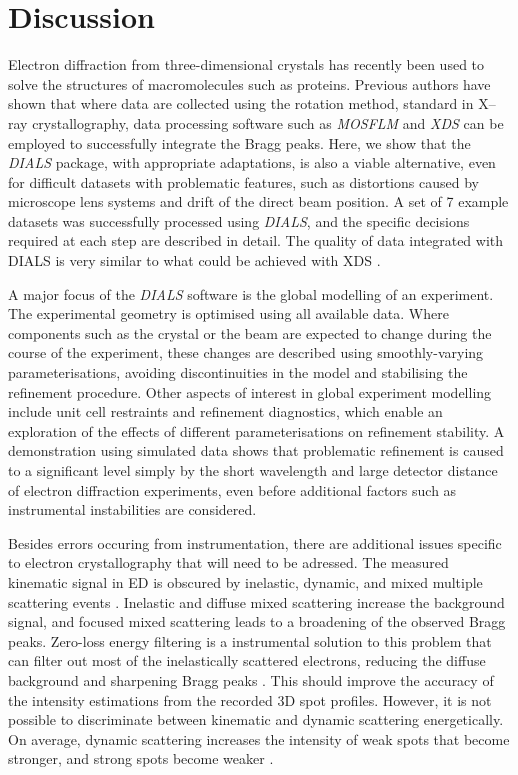 \documentclass[preprint]{iucr}
\newcommand{\dials}{\emph{DIALS}\xspace}
\newcommand{\xds}{\emph{XDS}\xspace}
\newcommand{\mosflm}{\emph{MOSFLM}\xspace}
\newcounter{MCCounter}
\newcommand{\MC}[1]{%
   \stepcounter{MCCounter}%
   {\color{blue}{\textbf{MC \#\arabic{MCCounter}: }#1}}%
  }
\begin{document}
\section{Discussion}

\MC{read again and revise some parts}

Electron diffraction from three-dimensional crystals has recently been used to
solve the structures of macromolecules such as proteins. Previous authors have
shown that where data are collected using the rotation method, standard in
X--ray crystallography, data processing software such as \mosflm and
\xds can be employed to successfully integrate the Bragg peaks. Here, we show
that the \dials package, with appropriate adaptations, is also a viable
alternative, even for difficult datasets with problematic features, such as
distortions caused by microscope lens systems and drift of the direct beam
position. A set of 7 example datasets was successfully processed using \dials,
and the specific decisions required at each step are described in detail. The
quality of data integrated with DIALS is very similar to what could be achieved 
with XDS \cite{Clabbers2017}.

A major focus of the \dials software is the global modelling of an experiment.
The experimental geometry is optimised using all available data. Where
components such as the crystal or the beam are expected to change during the
course of the experiment, these changes are described using smoothly-varying
parameterisations, avoiding discontinuities in the model and stabilising the
refinement procedure. Other aspects of interest in global experiment modelling
include unit cell restraints and refinement diagnostics, which enable an
exploration of the effects of different parameterisations on refinement
stability. A demonstration using simulated data shows that problematic
refinement is caused to a significant level simply by the short wavelength and
large detector distance of electron diffraction experiments, even before
additional factors such as instrumental instabilities are considered.

Besides errors occuring from instrumentation, there are additional issues
specific to electron crystallography that will need to be adressed.
The measured kinematic signal in ED is obscured by inelastic, dynamic, and mixed
multiple scattering events \cite{dorset:1995,zou:2011,Clabbers2018}. 
Inelastic and diffuse mixed scattering increase
the background signal, and focused mixed scattering leads to a broadening
of the observed Bragg peaks. Zero-loss energy filtering is a instrumental
solution to this problem that can filter out most of the inelastically
scattered electrons, reducing the diffuse background and sharpening Bragg
peaks \cite{Yonekura2002}. This should improve the accuracy of the intensity
estimations from the recorded 3D spot profiles. However, it is not possible
to discriminate between kinematic and dynamic scattering energetically. On average,
dynamic scattering increases the intensity of weak spots that become stronger,
and strong spots become weaker \cite{Weirich2000}. 
\end{document}
